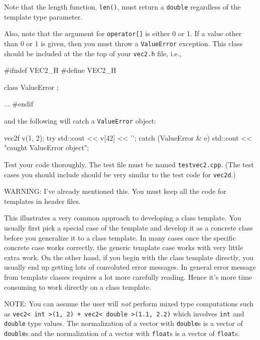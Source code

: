 Note that the length function,
\verb!len()!,
must return a \verb!double! regardless of the template type parameter.

Also, note that the argument for \verb!operator[]! is either 0 or 1.
If a value other than 0 or 1 is given, then you must
throw a \verb!ValueError! exception. This class should be included
at the the top of your \verb!vec2.h! file, i.e.,
\begin{console}
#ifndef VEC2_H
#define VEC2_H

class ValueError
{};

...
#endif
\end{console}
and the following will catch a \verb!ValueError! object:
\begin{console}
vec2f v(1, 2);
try
{
    std::cout << v[42] << '\n';
}
catch (ValueError & e)
{
    std::cout << "caught ValueError object\n";
}
\end{console}

Test your code thoroughly.
The test file must be named \verb!testvec2.cpp!.
(The test cases you should include should be very similar to the test code
for \verb!vec2d!.)

WARNING: I've already mentioned this. You must keep all the code for
templates in header files. 

This illustrates a very common approach to developing a class template.
You usually first pick a special case of the template and develop it as a
concrete class before you generalize it to a class template.
In many cases once the specific concrete case works correctly,
the generic template case works with very little extra work.
On the other hand, if you begin with the class template directly,
you usually end up getting lots of convoluted error messages.
In general error message from template classes requires a lot more
carefully reading. Hence it's more time consuming to work directly on
a class template.
 
NOTE: You can assume the user will \textit{not} perform
mixed type computations such as 
\texttt{vec2< int >(1, 2) + vec2< double >(1.1, 2.2)} which involves
\verb!int! and \verb!double! type values.
The
normalization of a vector with \texttt{double}s is a vector of \texttt{double}s
and the
normalization of a vector with \texttt{float}s is a vector of \texttt{float}s.



